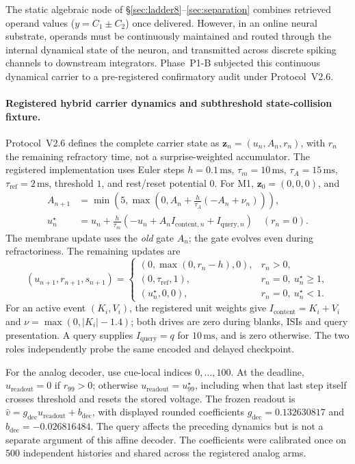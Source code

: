 The static algebraic node of \S\ref{sec:ladder8}--\ref{sec:separation} combines
retrieved operand values ($y = C_1 \pm C_2$) once delivered. However, in an online
neural substrate, operands must be continuously maintained and routed through the
internal dynamical state of the neuron, and transmitted across discrete spiking channels
to downstream integrators. Phase~P1-B subjected this continuous dynamical carrier to a pre-registered
confirmatory audit under Protocol~V2.6.

\paragraph{Registered hybrid carrier dynamics and subthreshold state-collision fixture.}
Protocol~V2.6 defines the complete carrier state as
$\mathbf{z}_n=(u_n,A_n,r_n)$, with $r_n$ the remaining refractory time,
not a surprise-weighted accumulator. The registered implementation uses
Euler steps $h=0.1\,\text{ms}$, $\tau_m=10\,\text{ms}$,
$\tau_A=15\,\text{ms}$, $\tau_{\mathrm{ref}}=2\,\text{ms}$,
threshold $1$, and rest/reset potential $0$. For M1,
$\mathbf{z}_0=(0,0,0)$, and
\begin{equation}
\begin{aligned}
 A_{n+1}&=\min\!\left(5,\max\!\left(0,
 A_n+\frac{h}{\tau_A}(-A_n+\nu_n)\right)\right),\\
 u_n^\star&=u_n+\frac{h}{\tau_m}
 \left(-u_n+A_n I_{\mathrm{content},n}+I_{\mathrm{query},n}\right)
 \quad (r_n=0).
\end{aligned}
\label{eq:p1b_carrier}
\end{equation}
The membrane update uses the \emph{old} gate $A_n$; the gate evolves even
during refractoriness. The remaining updates are
\[
(u_{n+1},r_{n+1},s_{n+1})=
\begin{cases}
 (0,\max(0,r_n-h),0),&r_n>0,\\
 (0,\tau_{\mathrm{ref}},1),&r_n=0,\ u_n^\star\ge1,\\
 (u_n^\star,0,0),&r_n=0,\ u_n^\star<1.
\end{cases}
\]
For an active event $(K_i,V_i)$, the registered unit weights give
$I_{\mathrm{content}}=K_i+V_i$ and
$\nu=\max(0,|K_i|-1.4)$; both drives are zero during blanks, ISIs and
query presentation. A query supplies $I_{\mathrm{query}}=q$ for
$10\,\text{ms}$, and is zero otherwise. The two roles independently probe
the same encoded and delayed checkpoint.

For the analog decoder, use cue-local indices $0,\ldots,100$.
At the deadline, $u_{\mathrm{readout}}=0$ if $r_{99}>0$; otherwise
$u_{\mathrm{readout}}=u_{99}^\star$, including when that last step itself
crosses threshold and resets the stored voltage. The frozen readout is
$\hat v=g_{\mathrm{dec}}u_{\mathrm{readout}}+b_{\mathrm{dec}}$,
with displayed rounded coefficients $g_{\mathrm{dec}}=0.132630817$ and
$b_{\mathrm{dec}}=-0.026816484$. The query affects the preceding dynamics
but is not a separate argument of this affine decoder. The coefficients
were calibrated once on 500 independent histories and shared across
the registered analog arms.


